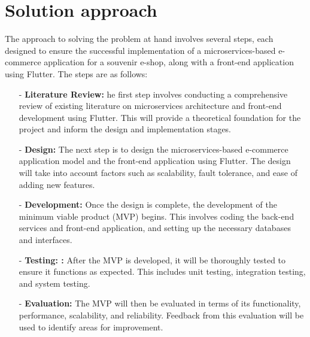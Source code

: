 \section{Solution approach}
The approach to solving the problem at hand involves several steps, each designed to ensure the successful implementation of a microservices-based e-commerce application for a souvenir e-shop, along with a front-end application using Flutter. The steps are as follows:
\begin{enumerate}
    \item[-] \textbf{Literature Review:} he first step involves conducting a comprehensive review of existing literature on microservices architecture and front-end development using Flutter. This will provide a theoretical foundation for the project and inform the design and implementation stages.
    \item[-] \textbf{Design:} The next step is to design the microservices-based e-commerce application model and the front-end application using Flutter. The design will take into account factors such as scalability, fault tolerance, and ease of adding new features.
    \item[-] \textbf{Development:} Once the design is complete, the development of the minimum viable product (MVP) begins. This involves coding the back-end services and front-end application, and setting up the necessary databases and interfaces.
    \item[-] \textbf{Testing: :} After the MVP is developed, it will be thoroughly tested to ensure it functions as expected. This includes unit testing, integration testing, and system testing.
    \item[-] \textbf{Evaluation:} The MVP will then be evaluated in terms of its functionality, performance, scalability, and reliability. Feedback from this evaluation will be used to identify areas for improvement.
\end{enumerate}

